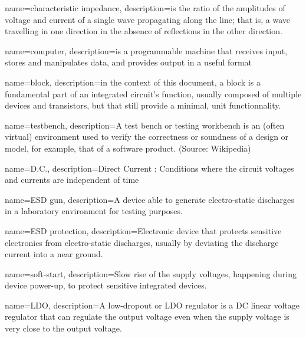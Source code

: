 %
%

{
  name=characteristic impedance,
  description={is the ratio of the amplitudes of voltage and current of a
               single wave propagating along the line;
               that is, a wave travelling in one direction in the absence of
               reflections in the other direction.}
}

{
  name=computer,
  description={is a programmable machine that receives input,
               stores and manipulates data, and provides
               output in a useful format}
}

{
  name=block,
  description={in the context of this document,
               a block is a fundamental part of an integrated circuit's function,
               usually composed of multiple devices and transistors,
               but that still provide a minimal, unit functionnality.}
}

{
  name=testbench,
  description={A test bench or testing workbench is an (often virtual)
               environment used to verify the correctness or soundness of a
               design or model, for example, that of a software product.
               (Source: Wikipedia)}
}

{
  name=D.C.,
  description={Direct Current : Conditions where the circuit voltages
               and currents are independent of time}
}

{
  name=ESD gun,
  description={A device able to generate electro-static discharges in a
               laboratory environment for testing purposes.}
}

{
  name=ESD protection,
  description={Electronic device that protects sensitive electronics from
               electro-static discharges, usually by deviating the discharge
               current into a near ground.}
}

{
  name=soft-start,
  description={Slow rise of the supply voltages, happening during device
  power-up, to protect sensitive integrated devices.}
}

{
  name=LDO,
  description={A low-dropout or LDO regulator is a DC linear voltage regulator
  that can regulate the output voltage even when the supply voltage
  is very close to the output voltage.}
}


